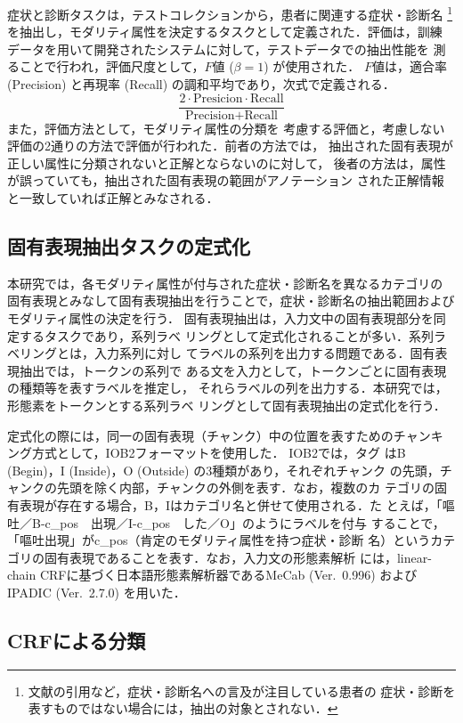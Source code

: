 \documentclass[japanese]{jnlp_1.4}
\begin{document}
症状と診断タスクは，テストコレクションから，患者に関連する症状・診断名
\footnote{文献の引用など，症状・診断名への言及が注目している患者の
症状・診断を表すものではない場合には，抽出の対象とされない．}
を抽出し，モダリティ属性を決定するタスクとして定義された．評価は，訓練
データを用いて開発されたシステムに対して，テストデータでの抽出性能を
測ることで行われ，評価尺度として，$F$値 ($\beta=1$) が使用された．
$F$値は，適合率 (Precision) と再現率 (Recall) の調和平均であり，次式で定義される．
\[
 \frac{2\cdot \mbox{Presicion} \cdot \mbox{Recall}}{\mbox{Precision}+\mbox{Recall}}
\]
また，評価方法として，モダリティ属性の分類を
考慮する評価と，考慮しない評価の2通りの方法で評価が行われた．前者の方法では，
抽出された固有表現が正しい属性に分類されないと正解とならないのに対して，
後者の方法は，属性が誤っていても，抽出された固有表現の範囲がアノテーション
された正解情報と一致していれば正解とみなされる．


\subsection{固有表現抽出タスクの定式化}
\label{sec:ner_formulation}

本研究では，各モダリティ属性が付与された症状・診断名を異なるカテゴリの
固有表現とみなして固有表現抽出を行うことで，症状・診断名の抽出範囲および
モダリティ属性の決定を行う．
固有表現抽出は，入力文中の固有表現部分を同定するタスクであり，系列ラベ
リングとして定式化されることが多い．系列ラベリングとは，入力系列に対し
てラベルの系列を出力する問題である．固有表現抽出では，トークンの系列で
ある文を入力として，トークンごとに固有表現の種類等を表すラベルを推定し，
それらラベルの列を出力する．本研究では，形態素をトークンとする系列ラベ
リングとして固有表現抽出の定式化を行う．

定式化の際には，同一の固有表現（チャンク）中の位置を表すためのチャンキ
ング方式として，IOB2フォーマット\cite{sang1999representing}を使用した．
IOB2では，タグ
はB (Begin)，I (Inside)，O (Outside) の3種類があり，それぞれチャンク
の先頭，チャンクの先頭を除く内部，チャンクの外側を表す．なお，複数のカ
テゴリの固有表現が存在する場合，B，Iはカテゴリ名と併せて使用される．た
とえば，「嘔吐／B-c\_pos~~出現／I-c\_pos~~した／O」のようにラベルを付与
することで，「嘔吐出現」がc\_pos（肯定のモダリティ属性を持つ症状・診断
名）というカテゴリの固有表現であることを表す．なお，入力文の形態素解析
には，linear-chain CRFに基づく日本語形態素解析器であるMeCab
\cite{kudo2004applying} (Ver.~0.996) およびIPADIC (Ver.~2.7.0) を用いた．


\subsection{CRFによる分類}
\label{sec:crf}
\end{document}
